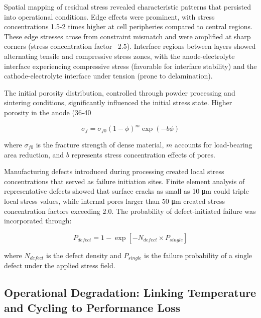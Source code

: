 \documentclass[conference]{IEEEtran}
\begin{document}
Spatial mapping of residual stress revealed characteristic patterns that persisted into operational conditions. Edge effects were prominent, with stress concentrations 1.5-2 times higher at cell peripheries compared to central regions. These edge stresses arose from constraint mismatch and were amplified at sharp corners (stress concentration factor ~2.5). Interface regions between layers showed alternating tensile and compressive stress zones, with the anode-electrolyte interface experiencing compressive stress (favorable for interface stability) and the cathode-electrolyte interface under tension (prone to delamination).

The initial porosity distribution, controlled through powder processing and sintering conditions, significantly influenced the initial stress state. Higher porosity in the anode (36-40%

\begin{equation}
\sigma_f = \sigma_{f0}(1-\phi)^m \exp(-b\phi)
\end{equation}

where $\sigma_{f0}$ is the fracture strength of dense material, $m$ accounts for load-bearing area reduction, and $b$ represents stress concentration effects of pores.

Manufacturing defects introduced during processing created local stress concentrations that served as failure initiation sites. Finite element analysis of representative defects showed that surface cracks as small as 10 μm could triple local stress values, while internal pores larger than 50 μm created stress concentration factors exceeding 2.0. The probability of defect-initiated failure was incorporated through:

\begin{equation}
P_{defect} = 1 - \exp\left[-N_{defect} \times P_{single}\right]
\end{equation}

where $N_{defect}$ is the defect density and $P_{single}$ is the failure probability of a single defect under the applied stress field.

\subsection{Operational Degradation: Linking Temperature and Cycling to Performance Loss}
\end{document}
